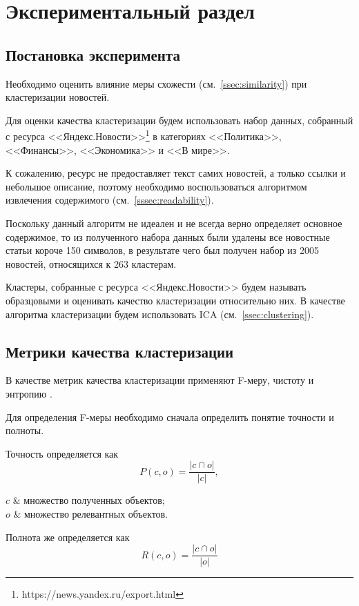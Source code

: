 \chapter{Экспериментальный раздел}
\section{Постановка эксперимента}
Необходимо оценить влияние меры схожести (см.~\ref{ssec:similarity}) при кластеризации новостей.

Для оценки качества кластеризации будем использовать набор данных, собранный с ресурса <<Яндекс.Новости>>\footnote{https://news.yandex.ru/export.html} в категориях <<Политика>>, <<Финансы>>, <<Экономика>> и <<В мире>>.

К сожалению, ресурс не предоставляет текст самих новостей, а только ссылки и небольшое описание, поэтому необходимо воспользоваться алгоритмом извлечения содержимого (см.~\ref{sssec:readability}).

Поскольку данный алгоритм не идеален и не всегда верно определяет основное содержимое, то из полученного набора данных были удалены все новостные статьи короче 150 символов, в результате чего был получен набор из 2005 новостей, относящихся к 263 кластерам.

Кластеры, собранные с ресурса <<Яндекс.Новости>> будем называть образцовыми и оценивать качество кластеризации относительно них. В качестве алгоритма кластеризации будем использовать ICA (см.~\ref{ssec:clustering}).

\section{Метрики качества кластеризации}
В качестве метрик качества кластеризации применяют F-меру, чистоту и энтропию \cite{andrews07}.

Для определения F-меры необходимо сначала определить понятие точности и полноты.

Точность определяется как
\begin{equation}
    P(c,o)=\frac{|c\cap o|}{|c|},
\end{equation}
\begin{conditions}
    $c$ & множество полученных объектов; \\
    $o$ & множество релевантных объектов. \\
\end{conditions}

Полнота же определяется как
\begin{equation}
    R(c,o)=\frac{|c\cap o|}{|o|}
\end{equation}

